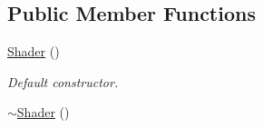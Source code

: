 \subsection*{Public Member Functions}
\begin{DoxyCompactItemize}
\item 
\hyperlink{classsf_1_1Shader_a1d7f28f26b4122959fcafec871c2c3c5}{Shader} ()
\begin{DoxyCompactList}\small\item\em Default constructor. \end{DoxyCompactList}\item 
\hypertarget{classsf_1_1Shader_a4bac6cc8b046ecd8fb967c145a2380e6}{\hyperlink{classsf_1_1Shader_a4bac6cc8b046ecd8fb967c145a2380e6}{$\sim$\-Shader} ()}\label{classsf_1_1Shader_a4bac6cc8b046ecd8fb967c145a2380e6}


\end{DoxyCompactItemize}
